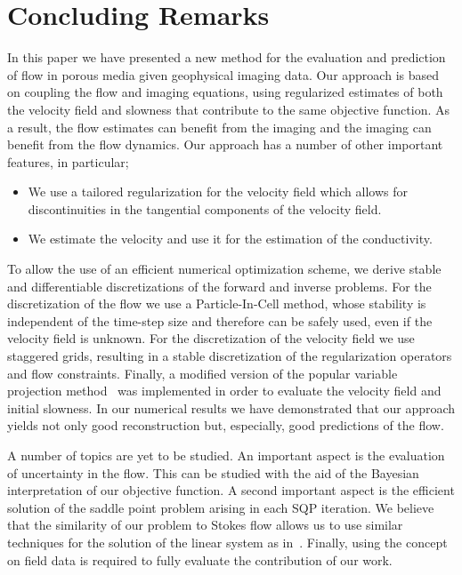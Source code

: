 \documentclass[english]{siamltex}
\newcommand{\alert}[1] {\textcolor{red}{#1}}
\begin{document}
\section{Concluding Remarks}

In this paper we have presented a new method for the evaluation  and prediction of flow in porous
media given geophysical imaging data. Our approach is based on coupling the flow and
imaging equations, using  regularized estimates 
of both the velocity field and slowness that contribute to the same objective function.
As a result, the flow estimates can benefit from the imaging and the imaging can benefit from the flow 
dynamics.
Our approach has a number of other important features, in particular;
\begin{itemize}
\item We use a tailored regularization for the velocity field which allows for
discontinuities in the tangential components of the velocity field.
\item We estimate the velocity and use it for the estimation of the conductivity.
\end{itemize}

To allow the use of an efficient numerical optimization scheme, we derive stable and differentiable discretizations of the forward and inverse problems.
For the discretization of the flow we use a Particle-In-Cell method, whose stability is independent of the time-step size and therefore can be safely used, even if the velocity field is unknown. 
For the discretization of the velocity field we use staggered grids,
resulting in a stable discretization of the regularization operators and flow constraints.
Finally,  a modified version of the popular variable projection method~\cite{GoPe03} was implemented in order to
evaluate the velocity field and initial slowness.
In our numerical results we have demonstrated that our approach yields not only
good reconstruction but, especially, good predictions of the flow. 



A number of topics are yet to be studied. An important aspect is the evaluation of uncertainty
in the flow. This can be studied with the aid of the Bayesian interpretation of our objective function.
A second important aspect is the efficient solution of the saddle point problem arising in each
SQP iteration. We believe that the similarity of our problem to Stokes flow
allows us to use similar techniques for the solution of the linear system as in~\cite{grgl}.
Finally, using the concept on field data is required to fully evaluate the contribution of our work.
\end{document}
